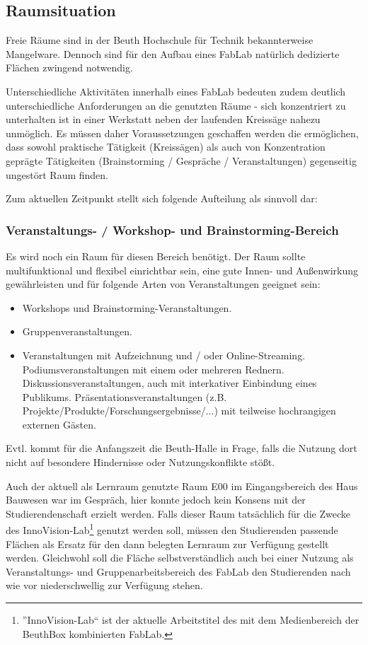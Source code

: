 \documentclass[parskip=half,headsepline,footsepline,titlepage]{scrartcl}
\begin{document}
\subsection{Raumsituation}
Freie Räume sind in der Beuth Hochschule für Technik bekannterweise Mangelware. Dennoch sind für den Aufbau eines FabLab natürlich dedizierte Flächen zwingend notwendig.

Unterschiedliche Aktivitäten innerhalb eines FabLab bedeuten zudem deutlich unterschiedliche Anforderungen an die genutzten Räume - sich konzentriert zu unterhalten ist in einer Werkstatt neben der laufenden Kreissäge nahezu unmöglich. Es müssen daher Voraussetzungen geschaffen werden die ermöglichen, dass sowohl praktische Tätigkeit (Kreissägen) als auch von Konzentration geprägte Tätigkeiten (Brainstorming / Gespräche / Veranstaltungen) gegenseitig ungestört Raum finden. 

Zum aktuellen Zeitpunkt stellt sich folgende Aufteilung als sinnvoll dar:

\subsubsection{Veranstaltungs- / Workshop- und Brainstorming-Bereich}
Es wird noch ein Raum für diesen Bereich benötigt. Der Raum sollte multifunktional und flexibel einrichtbar sein, eine gute Innen- und Außenwirkung gewährleisten und für folgende Arten von Veranstaltungen geeignet sein:
\begin{itemize}
 \item Workshops und Brainstorming-Veranstaltungen.
 \item Gruppenveranstaltungen.
 \item Veranstaltungen mit Aufzeichnung und / oder Online-Streaming.
 \subitem Podiumsveranstaltungen mit einem oder mehreren Rednern.
 \subitem Diskussionsveranstaltungen, auch mit interkativer Einbindung eines Publikums.
 \subitem Präsentationsveranstaltungen (z.B. Projekte/Produkte/Forschungsergebnisse/...) mit teilweise hochrangigen externen Gästen.
\end{itemize}
Evtl. kommt für die Anfangszeit die Beuth-Halle in Frage, falls die Nutzung dort nicht auf besondere Hindernisse oder Nutzungskonflikte stößt. 

Auch der aktuell als Lernraum genutzte Raum E00 im Eingangsbereich des Haus Bauwesen war im Gespräch, hier konnte jedoch kein Konsens mit der Studierendenschaft erzielt werden. Falls dieser Raum tatsächlich für die Zwecke des InnoVision-Lab\footnote{''InnoVision-Lab`` ist der aktuelle Arbeitstitel des mit dem Medienbereich der BeuthBox kombinierten FabLab.} genutzt werden soll, müssen den Studierenden passende Flächen als Ersatz für den dann belegten Lernraum zur Verfügung gestellt werden. Gleichwohl soll die Fläche selbstverständlich auch bei einer Nutzung als Veranstaltungs- und Gruppenarbeitsbereich des FabLab den Studierenden nach wie vor niederschwellig zur Verfügung stehen.
\end{document}
